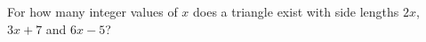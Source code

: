 For how many integer values of $x$ does a triangle exist with side lengths $2x$, $3x+7$ and $6x-5$?
